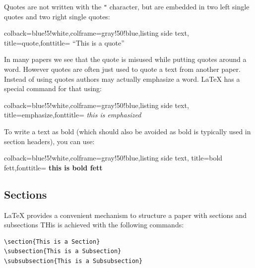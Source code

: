 Quotes are not written with the \verb|"| character, but are embedded in two
left single quotes and two right single quotes:



\begin{tcblisting}{colback=blue!5!white,colframe=gray!50!blue,listing side text,
  title=quote,fonttitle=\bfseries}
``This is a quote''
\end{tcblisting}



In many papers we see that the quote is misused while putting quotes
around a word. However quotes are often just used to quote a text from
another paper. Instead of using quotes authors may actually emphasize a
word. LaTeX has a special command for that using:

\begin{tcblisting}{colback=blue!5!white,colframe=gray!50!blue,listing side text,
  title=emphasize,fonttitle=\bfseries}
{\em this is emphasized}
\end{tcblisting}

To write a text as bold (which should also be avoided as bold is
typically used in section headers), you can use:

\begin{tcblisting}{colback=blue!5!white,colframe=gray!50!blue,listing side text,
  title=bold fett,fonttitle=\bfseries}
{\bf this is bold fett}
\end{tcblisting}

\subsection{Sections}\label{sections}

LaTeX provides a convenient mechanism to structure a paper with sections
and subsections THis is achieved with the following commands:

\begin{verbatim}
\section{This is a Section}
\subsection{This is a Subsection}
\subsubsection{This is a Subsubsection}  
\end{verbatim}

